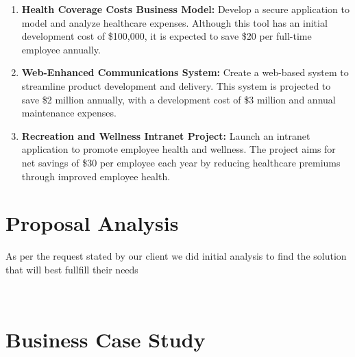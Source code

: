 \begin{enumerate}[label=\textbf{\arabic*.}]
    \item \textbf{Health Coverage Costs Business Model:} Develop a secure application to model and analyze healthcare expenses. Although this tool has an initial development cost of \$100,000, it is expected to save \$20 per full-time employee annually.

    \item \textbf{Web-Enhanced Communications System:} Create a web-based system to streamline product development and delivery. This system is projected to save \$2 million annually, with a development cost of \$3 million and annual maintenance expenses.

    \item \textbf{Recreation and Wellness Intranet Project:} Launch an intranet application to promote employee health and wellness. The project aims for net savings of \$30 per employee each year by reducing healthcare premiums through improved employee health.
\end{enumerate}

\section{Proposal Analysis}

As per the request stated by our client we did initial analysis to find the solution that will best fullfill their needs

\

\section{Business Case Study}